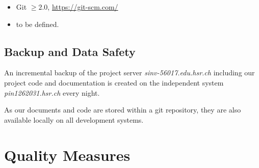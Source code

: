 \documentclass[a4paper]{article}
\begin{document}
\begin{itemize}
	\item Git $\geq 2.0$, \url{https://git-scm.com/}
	\item to be defined. %
\end{itemize}

\subsection{Backup and Data Safety}

An incremental backup of the project server \textit{sinv-56017.edu.hsr.ch} including our project code and documentation is created on the independent system \textit{pin1262031.hsr.ch} every night.

As our documents and code are stored within a git repository, they are also available locally on all development systems.



\section{Quality Measures}



\end{document}

